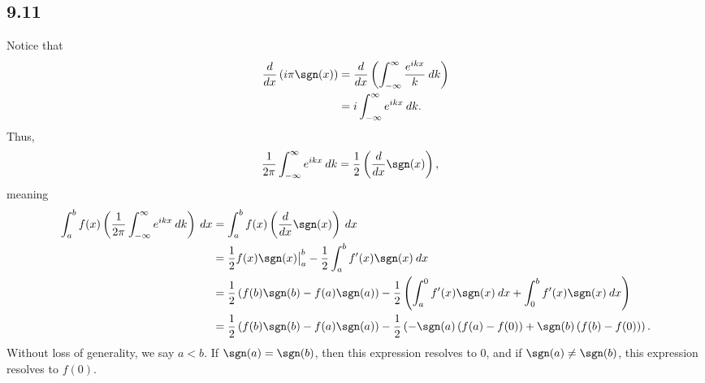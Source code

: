 \documentclass[10pt]{mypackage}
\begin{document}
\subsection{9.11}%
Notice that
\begin{align*}
  \frac{d}{dx}\left(i\pi \sgn(x)\right) &= \frac{d}{dx}\left(\int_{-\infty}^{\infty} \frac{e^{ikx}}{k}\:dk\right)\\
                                        &= i\int_{-\infty}^{\infty} e^{ikx}\:dk.
\end{align*}
Thus,
\begin{align*}
  \frac{1}{2\pi}\int_{-\infty}^{\infty} e^{ikx}\:dk &= \frac{1}{2}\left(\frac{d}{dx}\sgn(x)\right),
\end{align*}
meaning
\begin{align*}
  \int_{a}^{b} f(x)\left(\frac{1}{2\pi}\int_{-\infty}^{\infty} e^{ikx}\:dk\right)\:dx &= \int_{a}^{b} f(x)\left(\frac{d}{dx}\sgn(x)\right)\:dx\\
                                                                                      &= \frac{1}{2}f(x)\sgn(x)\bigr\vert_{a}^{b} - \frac{1}{2}\int_{a}^{b} f'(x)\sgn(x)\:dx\\
                                                                                      &= \frac{1}{2}\left(f(b)\sgn(b) - f(a)\sgn(a)\right) - \frac{1}{2}\left(\int_{a}^{0} f'(x)\sgn(x)\:dx + \int_{0}^{b} f'(x)\sgn(x)\:dx\right)\\
                                                                                      &= \frac{1}{2}\left(f(b)\sgn(b) - f(a)\sgn(a)\right) - \frac{1}{2}\left(-\sgn(a)\left(f(a) - f(0)\right) + \sgn(b)\left(f(b) - f(0)\right)\right).
\end{align*}
Without loss of generality, we say $a < b$. If $\sgn(a) = \sgn(b)$, then this expression resolves to $0$, and if $\sgn(a) \neq \sgn(b)$, this expression resolves to $f(0)$.
\end{document}
